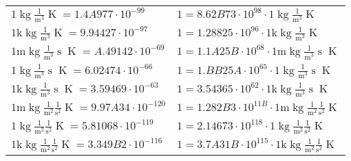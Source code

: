 \begin{center}
\begin{longtable}{l l}
{\color{black}$1 \bm{\mathrm{ }}\operatorname{kg}\frac1{\operatorname{m}^3}{}{}{\operatorname{K}} = 1.4A977\cdot10^{-99} $}   & {\color{black}$ 1 = 8.62B73\cdot10^{98} \cdot 1 \bm{\mathrm{ }}\operatorname{kg}\frac1{\operatorname{m}^3}{}{}{\operatorname{K}}$}  \\
{\color{gray}$1 \bm{\mathrm{ k}}\operatorname{kg}\frac1{\operatorname{m}^3}{}{}{\operatorname{K}} = 9.94427\cdot10^{-97} $}   & {\color{gray}$ 1 = 1.28825\cdot10^{96} \cdot 1 \bm{\mathrm{ k}}\operatorname{kg}\frac1{\operatorname{m}^3}{}{}{\operatorname{K}}$}  \\
{\color{gray}$1 \bm{\mathrm{ m}}\operatorname{kg}\frac1{\operatorname{m}^3}{\operatorname{s}}{}{\operatorname{K}} = A.49142\cdot10^{-69} $}   & {\color{gray}$ 1 = 1.1A25B\cdot10^{68} \cdot 1 \bm{\mathrm{ m}}\operatorname{kg}\frac1{\operatorname{m}^3}{\operatorname{s}}{}{\operatorname{K}}$}  \\
{\color{black}$1 \bm{\mathrm{ }}\operatorname{kg}\frac1{\operatorname{m}^3}{\operatorname{s}}{}{\operatorname{K}} = 6.02474\cdot10^{-66} $}   & {\color{black}$ 1 = 1.BB25A\cdot10^{65} \cdot 1 \bm{\mathrm{ }}\operatorname{kg}\frac1{\operatorname{m}^3}{\operatorname{s}}{}{\operatorname{K}}$}  \\
{\color{gray}$1 \bm{\mathrm{ k}}\operatorname{kg}\frac1{\operatorname{m}^3}{\operatorname{s}}{}{\operatorname{K}} = 3.59469\cdot10^{-63} $}   & {\color{gray}$ 1 = 3.54365\cdot10^{62} \cdot 1 \bm{\mathrm{ k}}\operatorname{kg}\frac1{\operatorname{m}^3}{\operatorname{s}}{}{\operatorname{K}}$}  \\
{\color{gray}$1 \bm{\mathrm{ m}}\operatorname{kg}\frac1{\operatorname{m}^2}\frac1{\operatorname{s}^2}{}{\operatorname{K}} = 9.97A34\cdot10^{-120} $}   & {\color{gray}$ 1 = 1.282B3\cdot10^{11B} \cdot 1 \bm{\mathrm{ m}}\operatorname{kg}\frac1{\operatorname{m}^2}\frac1{\operatorname{s}^2}{}{\operatorname{K}}$}  \\
{\color{black}$1 \bm{\mathrm{ }}\operatorname{kg}\frac1{\operatorname{m}^2}\frac1{\operatorname{s}^2}{}{\operatorname{K}} = 5.81068\cdot10^{-119} $}   & {\color{black}$ 1 = 2.14673\cdot10^{118} \cdot 1 \bm{\mathrm{ }}\operatorname{kg}\frac1{\operatorname{m}^2}\frac1{\operatorname{s}^2}{}{\operatorname{K}}$}  \\
{\color{gray}$1 \bm{\mathrm{ k}}\operatorname{kg}\frac1{\operatorname{m}^2}\frac1{\operatorname{s}^2}{}{\operatorname{K}} = 3.349B2\cdot10^{-116} $}   & {\color{gray}$ 1 = 3.7A31B\cdot10^{115} \cdot 1 \bm{\mathrm{ k}}\operatorname{kg}\frac1{\operatorname{m}^2}\frac1{\operatorname{s}^2}{}{\operatorname{K}}$}  \\

\end{longtable}
\end{center}
